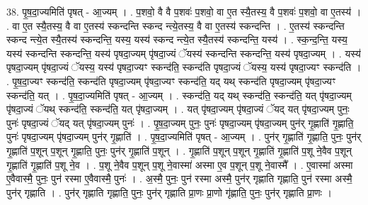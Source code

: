 \documentclass[17pt]{extarticle}
\begin{document}
38. पृ॒ष॒दा॒ज्यमिति॑ पृषत् - आ॒ज्यम् । . प॒शवो॒ वै वै प॒शवः॑ प॒शवो॒ वा ए॒त स्यै॒तस्य॒ वै प॒शवः॑ प॒शवो॒ वा ए॒तस्य॑ । . वा ए॒त स्यै॒तस्य॒ वै वा ए॒तस्य॑ स्कन्दन्ति स्कन्द न्त्ये॒तस्य॒ वै वा ए॒तस्य॑ स्कन्दन्ति । . ए॒तस्य॑ स्कन्दन्ति स्कन्द न्त्ये॒त स्यै॒तस्य॑ स्कन्दन्ति॒ यस्य॒ यस्य॑ स्कन्द न्त्ये॒त स्यै॒तस्य॑ स्कन्दन्ति॒ यस्य॑ । . स्क॒न्द॒न्ति॒ यस्य॒ यस्य॑ स्कन्दन्ति स्कन्दन्ति॒ यस्य॑ पृषदा॒ज्यम् पृ॑षदा॒ज्यं ॅयस्य॑ स्कन्दन्ति स्कन्दन्ति॒ यस्य॑ पृषदा॒ज्यम् । . यस्य॑ पृषदा॒ज्यम् पृ॑षदा॒ज्यं ॅयस्य॒ यस्य॑ पृषदा॒ज्यꣳ स्कन्द॑ति॒ स्कन्द॑ति पृषदा॒ज्यं ॅयस्य॒ यस्य॑ पृषदा॒ज्यꣳ स्कन्द॑ति । . पृ॒ष॒दा॒ज्यꣳ स्कन्द॑ति॒ स्कन्द॑ति पृषदा॒ज्यम् पृ॑षदा॒ज्यꣳ स्कन्द॑ति॒ यद् यथ् स्कन्द॑ति पृषदा॒ज्यम् पृ॑षदा॒ज्यꣳ स्कन्द॑ति॒ यत् । . पृ॒ष॒दा॒ज्यमिति॑ पृषत् - आ॒ज्यम् । . स्कन्द॑ति॒ यद् यथ् स्कन्द॑ति॒ स्कन्द॑ति॒ यत् पृ॑षदा॒ज्यम् पृ॑षदा॒ज्यं ॅयथ् स्कन्द॑ति॒ स्कन्द॑ति॒ यत् पृ॑षदा॒ज्यम् । . यत् पृ॑षदा॒ज्यम् पृ॑षदा॒ज्यं ॅयद् यत् पृ॑षदा॒ज्यम् पुनः॒ पुनः॑ पृषदा॒ज्यं ॅयद् यत् पृ॑षदा॒ज्यम् पुनः॑ । . पृ॒ष॒दा॒ज्यम् पुनः॒ पुनः॑ पृषदा॒ज्यम् पृ॑षदा॒ज्यम् पुन॑र् गृ॒ह्णाति॑ गृ॒ह्णाति॒ पुनः॑ पृषदा॒ज्यम् पृ॑षदा॒ज्यम् पुन॑र् गृ॒ह्णाति॑ । . पृ॒ष॒दा॒ज्यमिति॑ पृषत् - आ॒ज्यम् । . पुन॑र् गृ॒ह्णाति॑ गृ॒ह्णाति॒ पुनः॒ पुन॑र् गृ॒ह्णाति॑ प॒शून् प॒शून् गृ॒ह्णाति॒ पुनः॒ पुन॑र् गृ॒ह्णाति॑ प॒शून् । . गृ॒ह्णाति॑ प॒शून् प॒शून् गृ॒ह्णाति॑ गृ॒ह्णाति॑ प॒शू ने॒वैव प॒शून् गृ॒ह्णाति॑ गृ॒ह्णाति॑ प॒शू ने॒व । . प॒शू ने॒वैव प॒शून् प॒शू ने॒वास्मा॑ अस्मा ए॒व प॒शून् प॒शू ने॒वास्मै᳚ । . ए॒वास्मा॑ अस्मा ए॒वैवास्मै॒ पुनः॒ पुन॑ रस्मा ए॒वैवास्मै॒ पुनः॑ । . अ॒स्मै॒ पुनः॒ पुन॑ रस्मा अस्मै॒ पुन॑र् गृह्णाति गृह्णाति॒ पुन॑ रस्मा अस्मै॒ पुन॑र् गृह्णाति । . पुन॑र् गृह्णाति गृह्णाति॒ पुनः॒ पुन॑र् गृह्णाति प्रा॒णः प्रा॒णो गृ॑ह्णाति॒ पुनः॒ पुन॑र् गृह्णाति प्रा॒णः । \newline
\end{document}

